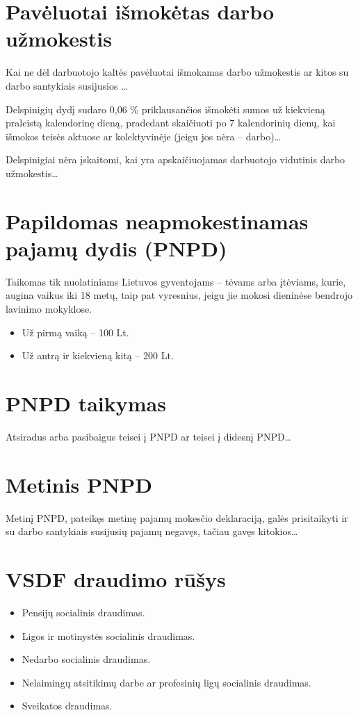 \section{Pavėluotai išmokėtas darbo užmokestis}

Kai ne dėl darbuotojo kaltės pavėluotai išmokamas darbo užmokestis ar
kitos su darbo santykiais susijusios …

Delspinigių dydį sudaro 0,06 \% priklausančios išmokėti sumos už
kiekvieną praleistą kalendorinę dieną, pradedant skaičiuoti po
7 kalendorinių dienų, kai išmokos teisės aktuose ar kolektyvinėje
(jeigu jos nėra – darbo)…

Delspinigiai nėra įskaitomi, kai yra apskaičiuojamas darbuotojo vidutinis
darbo užmokestis…

\section{Papildomas neapmokestinamas pajamų dydis (PNPD)}

Taikomas tik nuolatiniams Lietuvos gyventojams – tėvams arba įtėviams,
kurie, augina vaikus iki 18 metų, taip pat vyresnius, jeigu
jie mokosi dieninėse bendrojo lavinimo mokyklose.

\begin{itemize}
  \item Už pirmą vaiką – 100 Lt.
  \item Už antrą ir kiekvieną kitą – 200 Lt.
\end{itemize}

\section{PNPD taikymas}

Atsiradus arba pasibaigus teisei į PNPD ar teisei į didesnį
PNPD…

\section{Metinis PNPD}

Metinį PNPD, pateikęs metinę pajamų mokesčio deklaraciją, galės
prisitaikyti ir su darbo santykiais susijusių pajamų negavęs, tačiau
gavęs kitokios…

\section{VSDF draudimo rūšys}

\begin{itemize}
  \item Pensijų socialinis draudimas.
  \item Ligos ir motinystės socialinis draudimas.
  \item Nedarbo socialinis draudimas.
  \item Nelaimingų atsitikimų darbe ar profesinių ligų socialinis draudimas.
  \item Sveikatos draudimas.
\end{itemize}

